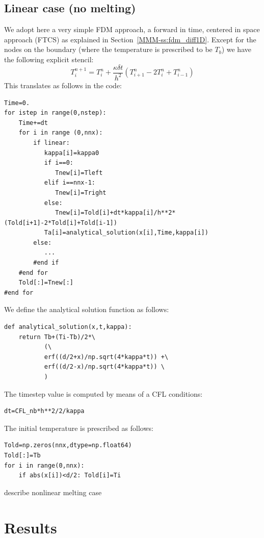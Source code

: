 \subsection*{Linear case (no melting)}

We adopt here a very simple FDM approach, a forward in time, 
centered in space approach (FTCS) as explained in Section~\ref{MMM-ss:fdm_diff1D}. 
Except for the nodes on the boundary (where the temperature
is prescribed to be $T_b$) we have the following explicit stencil:
\[
T_i^{n+1} 
= 
T_i^n + \frac{\kappa \delta t }{h^2} (T_{i+1}^n-2T_i^n+T_{i-1}^n)
\]
This translates as follows in the code:

\begin{lstlisting}
Time=0.
for istep in range(0,nstep):
    Time+=dt
    for i in range (0,nnx):
        if linear:
           kappa[i]=kappa0
           if i==0:
              Tnew[i]=Tleft
           elif i==nnx-1:
              Tnew[i]=Tright
           else:
              Tnew[i]=Told[i]+dt*kappa[i]/h**2*(Told[i+1]-2*Told[i]+Told[i-1])
           Ta[i]=analytical_solution(x[i],Time,kappa[i])
        else:
           ...
        #end if
    #end for
    Told[:]=Tnew[:]
#end for
\end{lstlisting}
We define the analytical solution function as follows:
\begin{lstlisting}
def analytical_solution(x,t,kappa):
    return Tb+(Ti-Tb)/2*\
           (\
           erf((d/2+x)/np.sqrt(4*kappa*t)) +\
           erf((d/2-x)/np.sqrt(4*kappa*t)) \
           )
\end{lstlisting}
The timestep value is computed by means of a CFL conditions:
\begin{lstlisting}
dt=CFL_nb*h**2/2/kappa
\end{lstlisting}
The initial temperature is prescribed as follows:
\begin{lstlisting}
Told=np.zeros(nnx,dtype=np.float64)
Told[:]=Tb
for i in range(0,nnx):
    if abs(x[i])<d/2: Told[i]=Ti
\end{lstlisting}


{\color{red} describe nonlinear melting case}

\section*{Results}

